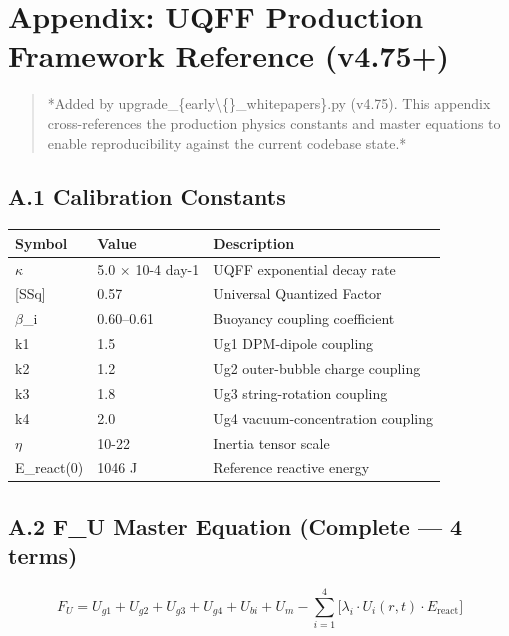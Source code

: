 \documentclass[11pt]{article}
\begin{document}
\section*{Appendix: UQFF Production Framework Reference (v4.75+)}

\begin{quote}
*Added by upgrade\_\{early\textbackslash\{\}\_whitepapers\}.py (v4.75). This appendix cross-references
the production physics constants and master equations to enable reproducibility
against the current codebase state.*
\end{quote}

\subsection*{A.1 Calibration Constants}

\begin{center}
\begin{longtable}{lll}
\toprule
Symbol & Value & Description \tabularnewline
\midrule
\endhead
$\kappa$ & 5.0 $\times$ 10-4 day-1 & UQFF exponential decay rate \tabularnewline
{}[SSq] & 0.57 & Universal Quantized Factor \tabularnewline
$\beta$\_i & 0.60--0.61 & Buoyancy coupling coefficient \tabularnewline
k1 & 1.5 & Ug1 DPM-dipole coupling \tabularnewline
k2 & 1.2 & Ug2 outer-bubble charge coupling \tabularnewline
k3 & 1.8 & Ug3 string-rotation coupling \tabularnewline
k4 & 2.0 & Ug4 vacuum-concentration coupling \tabularnewline
$\eta$ & 10-22 & Inertia tensor scale \tabularnewline
E\_react(0) & 1046 J & Reference reactive energy \tabularnewline
\bottomrule
\end{longtable}
\end{center}

\subsection*{A.2 F\_U Master Equation (Complete --- 4 terms)}

$$F_U = U_{g1} + U_{g2} + U_{g3} + U_{g4} + U_{bi} + U_m - \sum_{i=1}^{4}\bigl[\lambda_i \cdot U_i(r,t) \cdot E_{\mathrm{react}}\bigr]$$
\end{document}
